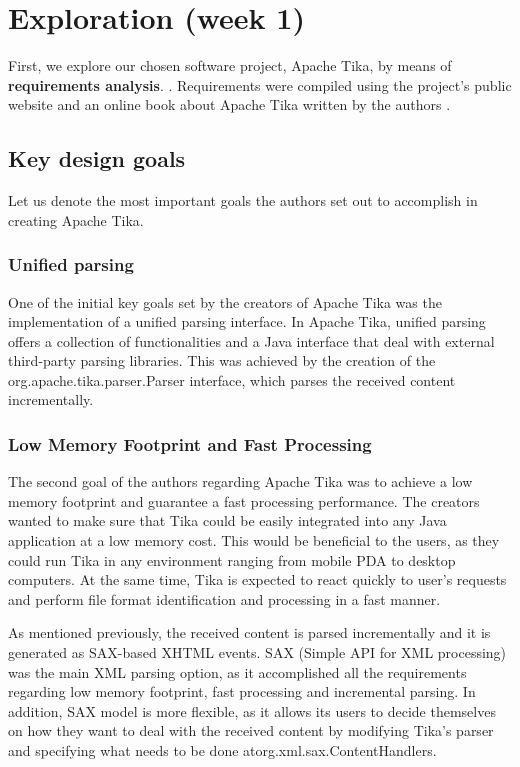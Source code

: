\documentclass{article}
\begin{document}
\section{Exploration (week 1)}
First, we explore our chosen software project, Apache Tika, by means of \textbf{requirements analysis}. \citep{dresner1964maintenance}. Requirements were compiled using the project's public website \citep{apache_software_foundation_2020} and an online book about Apache Tika written by the authors \citep{tika_in_action}. 

\subsection{Key design goals}
Let us denote the most important goals the authors set out to accomplish in creating Apache Tika.
\subsubsection{Unified parsing}
One of the initial key goals set by the creators of Apache Tika was the implementation of a unified parsing interface.  In Apache Tika, unified parsing offers a collection of functionalities and a Java interface that deal with external third-party parsing libraries. This was achieved by the creation of the org.apache.tika.parser.Parser interface, which parses the received content incrementally.

\subsubsection{Low Memory Footprint and Fast Processing}
The second goal of the authors regarding Apache Tika was to achieve a low memory footprint and guarantee a fast processing performance. The creators wanted to make sure that Tika could be easily integrated into any Java application at a low memory cost. This would be beneficial to the users, as they could run Tika in any environment ranging from mobile PDA to desktop computers. At the same time, Tika is expected to react quickly to user’s requests and perform file format identification and processing in a fast manner.

As mentioned previously, the received content is parsed incrementally and it is generated as SAX-based XHTML events. SAX (Simple API for XML processing) was the main XML parsing option, as it accomplished all the requirements regarding low memory footprint, fast processing and incremental parsing. In addition, SAX model is more flexible, as it allows its users to decide themselves on how they want to deal with the received content by modifying Tika’s parser and specifying what needs to be done atorg.xml.sax.ContentHandlers.
\end{document}
